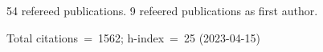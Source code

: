 54 refereed publications. 9 refeered publications as first author.

Total citations~=~1562; h-index~=~25 (2023-04-15)